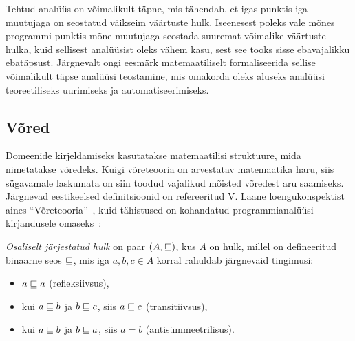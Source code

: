 \documentclass[../thesis.tex]{subfiles}
\begin{document}
\begin{itemize}
\begin{comment}
		Iseenesest poleks vale seostada selle programmi punktiga mõnda (osalise järjestuse järgi) üldisemat seisundit, nt $\{5, 6, 7\}$ või lausa $\top$, kuid see poleks nii kasulik, sest analüüsi mõte on siiski leida võimalikult täpne kirjeldus. Just selle täpsuse matemaatiliseks kirjeldamiseks nõutaksegi osalist järjestust.
	\item Punktiga 5 sobib samal põhjusel seostada element $\{3\}$.
	\item Punktis 6 on olukord huvitavam, sest seda seisundit pole programmis oleva hargnemise (täpsemalt selle ühendumise) tõttu kirjeldada ühe täisarvuga, vaid elemendiga $\{3, 5\}$. Selle tulemuseni jõudmiseks peab intuitiivselt ühendama eelneva kahe punkti seisundid --- leidma seisundi, mis hõlmaks eelnevaid, olles seejuures võimalikult täpne. Just selleks nõutaksegi ülemise raja leidmise tehet, millega seda teha. Antud juhul $\{3\} \sqcup \{5\} = \{3, 5\}$.
\end{comment}
\end{itemize}

Tehtud analüüs on võimalikult täpne, mis tähendab, et igas punktis iga muutujaga on seostatud väikseim väärtuste hulk. Iseenesest poleks vale mõnes programmi punktis mõne muutujaga seostada suuremat võimalike väärtuste hulka, kuid sellisest analüüsist oleks vähem kasu, sest see tooks sisse ebavajalikku ebatäpsust.
Järgnevalt ongi eesmärk matemaatiliselt formaliseerida sellise võimalikult täpse analüüsi teostamine, mis omakorda oleks aluseks analüüsi teoreetiliseks uurimiseks ja automatiseerimiseks.


\subsection{Võred}
Domeenide kirjeldamiseks kasutatakse matemaatilisi struktuure, mida nimetatakse võredeks. Kuigi võreteooria on arvestatav matemaatika haru, siis sügavamale laskumata on siin toodud vajalikud mõisted võredest aru saamiseks.
Järgnevad eestikeelsed definitsioonid on refereeritud V. Laane loengukonspektist aines \enquote{Võreteooria}~\cite{laan_voreteooria}, kuid tähistused on kohandatud programmianalüüsi kirjandusele omaseks~\cites[17]{seidl_foundations}{vojdani_magister}:

\begin{definition}
\label{def:järjestatud_hulk}
\emph{Osaliselt järjestatud hulk} on paar $(A, \sqsubseteq)$, kus $A$ on hulk, millel on defineeritud binaarne seos $\sqsubseteq$, mis iga $a, b, c \in A$ korral rahuldab järgnevaid tingimusi:
\begin{itemize}[nosep]
	\item $a \sqsubseteq a$ (refleksiivsus),
	\item kui $a \sqsubseteq b$ ja $b \sqsubseteq c$, siis $a \sqsubseteq c$ (transitiivsus),
	\item kui $a \sqsubseteq b$ ja $b \sqsubseteq a$, siis $a = b$ (antisümmeetrilisus).
\end{itemize}
\end{definition}
\end{document}

